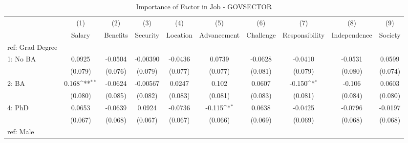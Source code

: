 \begin{table}[htbp]\centering
\def\sym#1{\ifmmode^{#1}\else\(^{#1}\)\fi}
\caption{Importance of Factor in Job - GOVSECTOR \label{tab1}}
\begin{tabular}{l*{9}{c}}
\hline\hline
  &\multicolumn{1}{c}{(1)}&\multicolumn{1}{c}{(2)}&\multicolumn{1}{c}{(3)}&\multicolumn{1}{c}{(4)}&\multicolumn{1}{c}{(5)}&\multicolumn{1}{c}{(6)}&\multicolumn{1}{c}{(7)}&\multicolumn{1}{c}{(8)}&\multicolumn{1}{c}{(9)}\\
  &\multicolumn{1}{c}{Salary}&\multicolumn{1}{c}{Benefits}&\multicolumn{1}{c}{Security}&\multicolumn{1}{c}{Location}&\multicolumn{1}{c}{Advancement}&\multicolumn{1}{c}{Challenge}&\multicolumn{1}{c}{Responsibility}&\multicolumn{1}{c}{Independence}&\multicolumn{1}{c}{Society}\\
\hline
ref: Grad Degree&                     &                     &                     &                     &                     &                     &                     &                     &                     \\
[1em]
1: No BA&      0.0925         &     -0.0504         &    -0.00390         &     -0.0436         &      0.0739         &     -0.0628         &     -0.0410         &     -0.0531         &      0.0599         \\
  &     (0.079)         &     (0.076)         &     (0.079)         &     (0.077)         &     (0.077)         &     (0.081)         &     (0.079)         &     (0.080)         &     (0.074)         \\
[1em]
2: BA&       0.168\sym{**} &     -0.0624         &    -0.00567         &      0.0247         &       0.102         &      0.0607         &      -0.150\sym{*}  &      -0.106         &      0.0603         \\
  &     (0.080)         &     (0.085)         &     (0.082)         &     (0.083)         &     (0.081)         &     (0.083)         &     (0.081)         &     (0.084)         &     (0.080)         \\
[1em]
4: PhD&      0.0653         &     -0.0639         &      0.0924         &     -0.0736         &      -0.115\sym{*}  &      0.0638         &     -0.0425         &     -0.0796         &     -0.0197         \\
  &     (0.067)         &     (0.068)         &     (0.067)         &     (0.067)         &     (0.066)         &     (0.069)         &     (0.069)         &     (0.068)         &     (0.068)         \\
[1em]
ref: Male&                     &                     &                     &                     &                     &                     &                     &                     &                     \\

\end{tabular}
\end{table}
